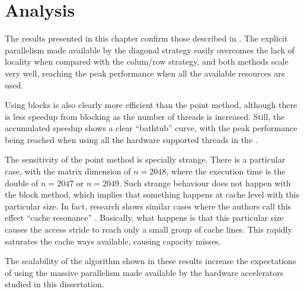 \documentclass[../thesis]{subfiles}
\begin{document}
	\section{Analysis}
	\label{sec:multicore:analysis}

	The results presented in this chapter confirm those described in \cite{Deadman:Higham:Ralha:2013}. The explicit parallelism made available by the diagonal strategy easily overcomes the lack of locality when compared with the colum/row strategy, and both methods scale very well, reaching the peak performance when all the available resources are used.

	Using blocks is also clearly more efficient than the point method, although there is less speedup from blocking as the number of threads is increased. Still, the accumulated speedup shows a clear ``bathtub'' curve, with the peak performance being reached when using all the hardware supported threads in the \cpu.

	The sensitivity of the point method is specially strange. There is a particular case, with the matrix dimension of $n = 2048$, where the execution time is the double of $n = 2047$ or $n = 2049$. Such strange behaviour does not happen with the block method, which implies that something happens at cache level with this particular size. In fact, research shows similar cases where the authors call this effect ``cache resonance'' \cite{MathWorks:LAPACK,SO:cache_resonance}. Basically, what happens is that this particular size causes the access stride to reach only a small group of cache lines. This rapidly saturates the cache ways available, causing capacity misses.

	The scalability of the algorithm shown in these results increase the expectations of using the massive parallelism made available by the hardware accelerators studied in this dissertation.
\end{document}
